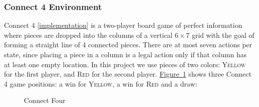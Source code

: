\documentclass{article}
\newcommand{\GithubURL}[1]{[\href{https://github.com/davidrobles/mlnd-capstone-code/blob/master/#1}{implementation}]}
\begin{document}
\pagebreak[4]


\subsubsection{Connect 4 Environment}

Connect 4 \GithubURL{capstone/game/games/connect4.py} is a two-player board game of perfect
information where pieces are dropped into the columns of a vertical $6 \times 7$ grid with the goal
of forming a straight line of 4 connected pieces. There are at most seven actions per state, since
placing a piece in a column is a legal action only if that column has at least one empty location.
In this project we use pieces of two colors: \textsc{Yellow} for the first player, and \textsc{Red}
for the second player. \hyperref[fig:c4-env]{Figure~\ref*{fig:c4-env}} shows three Connect 4 game
positions: a win for \textsc{Yellow}, a win for \textsc{Red} and a draw:


\begin{figure}[!h]
    \centering
     \hspace{0.1in}
     \hspace{0.1in}
    \caption{Connect Four}
    \label{fig:c4-env}
\end{figure}
\end{document}
